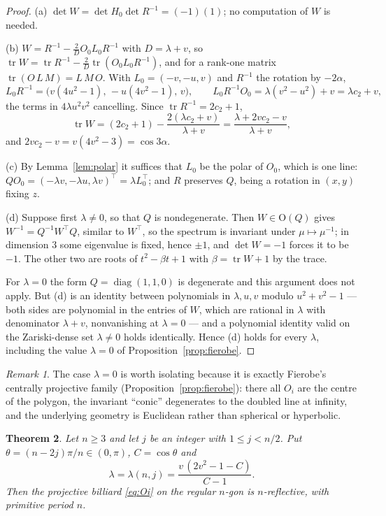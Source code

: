 \documentclass[11pt,a4paper]{article}
\theoremstyle{plain}
\newtheorem{theorem}{Theorem}[section]
\theoremstyle{definition}
\theoremstyle{remark}
\newtheorem{remark}[theorem]{Remark}
\newcommand{\tr}{\operatorname{tr}}
\begin{document}
\begin{proof}
(a) $\det W=\det H_0\det R^{-1}=(-1)(1)$; no computation of $W$ is needed.

(b) $W=R^{-1}-\frac2D O_0L_0R^{-1}$ with $D=\lambda+v$, so
$\tr W=\tr R^{-1}-\frac2D\tr(O_0L_0R^{-1})$, and for a rank-one matrix
$\tr(O\,L\,M)=L\,M\,O$. With $L_0=(-v,-u,v)$ and $R^{-1}$ the rotation by
$-2\alpha$,
\[
  L_0R^{-1}=\bigl(v(4u^2-1),\,-u(4v^2-1),\,v\bigr),\qquad
  L_0R^{-1}O_0=\lambda(v^2-u^2)+v=\lambda c_2+v,
\]
the terms in $4\lambda u^2v^2$ cancelling. Since $\tr R^{-1}=2c_2+1$,
\[
  \tr W=(2c_2+1)-\frac{2(\lambda c_2+v)}{\lambda+v}=\frac{\lambda+2vc_2-v}{\lambda+v},
\]
and $2vc_2-v=v(4v^2-3)=\cos3\alpha$.

(c) By Lemma~\ref{lem:polar} it suffices that $L_0$ be the polar of $O_0$, which is
one line: $QO_0=(-\lambda v,-\lambda u,\lambda v)^\top=\lambda L_0^\top$; and $R$
preserves $Q$, being a rotation in $(x,y)$ fixing $z$.

(d) Suppose first $\lambda\neq0$, so that $Q$ is nondegenerate. Then
$W\in\mathrm{O}(Q)$ gives $W^{-1}=Q^{-1}W^\top Q$, similar to $W^\top$, so the
spectrum is invariant under $\mu\mapsto\mu^{-1}$; in dimension $3$ some eigenvalue
is fixed, hence $\pm1$, and $\det W=-1$ forces it to be $-1$. The other two are
roots of $t^2-\beta t+1$ with $\beta=\tr W+1$ by the trace.

For $\lambda=0$ the form $Q=\operatorname{diag}(1,1,0)$ is degenerate and this
argument does not apply. But (d) is an identity between polynomials in
$\lambda,u,v$ modulo $u^2+v^2-1$ --- both sides are polynomial in the entries of
$W$, which are rational in $\lambda$ with denominator $\lambda+v$, nonvanishing at
$\lambda=0$ --- and a polynomial identity valid on the Zariski-dense set
$\lambda\neq0$ holds identically. Hence (d) holds for every $\lambda$, including
the value $\lambda=0$ of Proposition~\ref{prop:fierobe}.
\end{proof}

\begin{remark}
The case $\lambda=0$ is worth isolating because it is exactly Fierobe's centrally
projective family (Proposition~\ref{prop:fierobe}): there all $O_i$ are the centre
of the polygon, the invariant ``conic'' degenerates to the doubled line at
infinity, and the underlying geometry is Euclidean rather than spherical or
hyperbolic.
\end{remark}

\begin{theorem}\label{thm:main}
Let $n\ge3$ and let $j$ be an integer with $1\le j<n/2$. Put
$\theta=(n-2j)\pi/n\in(0,\pi)$, $C=\cos\theta$ and
\begin{equation}\label{eq:lambda}
  \lambda=\lambda(n,j)=\frac{v\,(2v^2-1-C)}{C-1}.
\end{equation}
Then the projective billiard \eqref{eq:Oi} on the regular $n$-gon is
$n$-reflective, with primitive period $n$.
\end{theorem}
\end{document}
